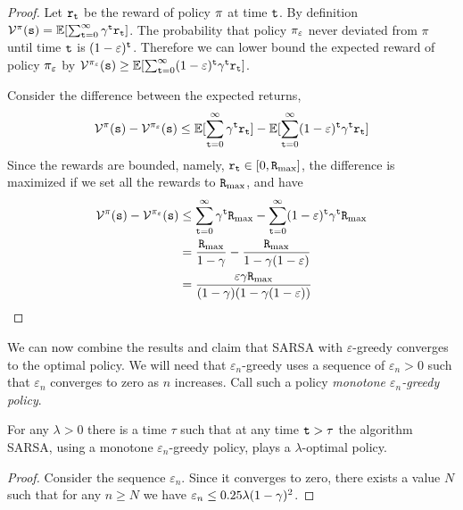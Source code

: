\begin{advanced}
\begin{proof}
Let ${\tt r}_{\tt t}$ be the reward of policy $\pi$ at time
${\tt t}$. By definition
$\mathcal{V}^\pi({\tt s})=\mathbb{E}[\sum_{{\tt t}=0}^\infty
\gamma^{\tt t}{\tt r}_{\tt t}]$. The probability that policy
$\pi_\varepsilon$ never deviated from $\pi$ until time ${\tt t}$
is $(1-\varepsilon)^{\tt t}$. Therefore we can lower bound the
expected reward of policy $\pi_\varepsilon$ by
$\mathcal{V}^{\pi_\varepsilon}({\tt s})\geq \mathbb{E}[\sum_{{\tt t}=0}^\infty
(1-\varepsilon)^{\tt t}\gamma^{\tt t}{\tt r}_{\tt t}]$.

Consider the difference between the expected returns,
\[
\mathcal{V}^\pi({\tt s})- \mathcal{V}^{\pi_\varepsilon}({\tt s}) \leq
\mathbb{E}[\sum_{{\tt t}=0}^\infty \gamma^{\tt t}{\tt r}_{\tt t}] -
\mathbb{E}[\sum_{{\tt t}=0}^\infty
(1-\varepsilon)^{\tt t}\gamma^{\tt t}{\tt r}_{\tt t}]
\]
Since the rewards are bounded, namely, ${\tt r}_{\tt t}\in[0,{\tt R}_{\max }]$, the
difference is maximized if we set all the rewards to ${\tt R}_{\max }$, and have
\begin{align*}
\mathcal{V}^\pi({\tt s})- \mathcal{V}^{\pi_\varepsilon}({\tt s}) &\leq
\sum_{{\tt t}=0}^\infty \gamma^{\tt t}{\tt R}_{\max } - \sum_{{\tt t}=0}^\infty
(1-\varepsilon)^{\tt t}\gamma^{\tt t}{\tt R}_{\max }\\
&=
\frac{{\tt R}_{\max }}{1-\gamma}-\frac{{\tt R}_{\max }}{1-\gamma(1-\varepsilon)}\\
&=\frac{\varepsilon\gamma{\tt R}_{\max }}{(1-\gamma)(1-\gamma(1-\varepsilon))}
\end{align*}
\end{proof}

We can now combine the results and claim that SARSA with
$\varepsilon$-greedy converges to the optimal policy. We will need
that $\varepsilon_n$-greedy uses a sequence of $\varepsilon_n>0$ such
that $\varepsilon_n$ converges to zero as $n$ increases. Call such a
policy \emph{monotone $\varepsilon_n$-greedy policy}.

\begin{theorem}
For any $\lambda>0$ there is a time $\tau$ such that at any time
${\tt t}>\tau$ the algorithm SARSA, using a monotone
$\varepsilon_n$-greedy policy, plays a $\lambda$-optimal policy.
\end{theorem}

\begin{proof}
Consider the sequence $\varepsilon_n$. Since it converges to zero, there exists a value $N$ such that for any $n\geq N$ we have $\varepsilon_n\leq 0.25\lambda(1-\gamma)^2$.


\end{proof}
\end{advanced}
